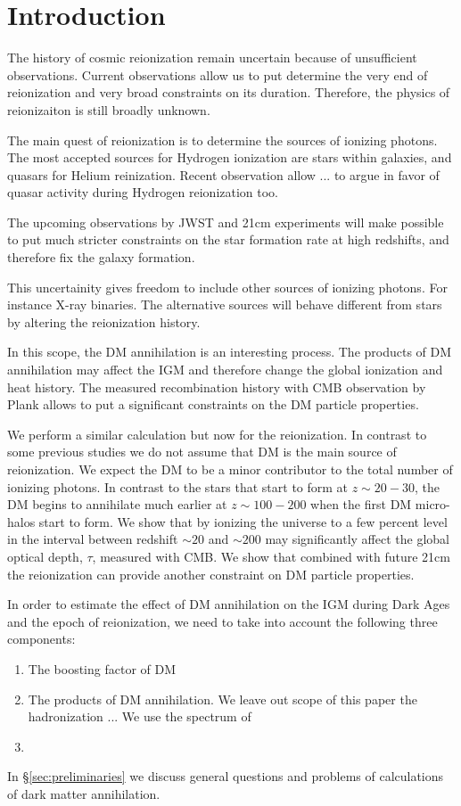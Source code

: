 \section{Introduction}

The history of cosmic reionization remain uncertain because of unsufficient observations. Current observations allow us to put determine the very end of reionization and very broad constraints on its duration. Therefore, the physics of reionizaiton is still broadly unknown.

The main quest of reionization is to determine the sources of ionizing photons. The most accepted sources for Hydrogen ionization are stars within galaxies, and quasars for Helium reinization. Recent observation allow ... to argue in favor of quasar activity during Hydrogen reionization too.

The upcoming observations by JWST and 21cm experiments will make possible to put much stricter constraints on the star formation rate at high redshifts, and therefore fix the galaxy formation.

This uncertainity gives freedom to include other sources of ionizing photons. For instance X-ray binaries. The alternative sources will behave different from stars by altering the reionization history. 

In this scope, the DM annihilation is an interesting process. The products of DM annihilation may affect the IGM and therefore change the global ionization and heat history. The measured recombination history with CMB observation by Plank allows \cite{2015arXiv150603811S} to put a significant constraints on the DM particle properties.

We perform a similar calculation but now for the reionization. In contrast to some previous studies \cite{2009JCAP...10..009C, 2009PhRvD..80c5007B} we do not assume that DM is the main source of reionization. We expect the DM to be a minor contributor to the total number of ionizing photons. In contrast to the stars that start to form at $z\sim 20-30$, the DM begins to annihilate much earlier at $z\sim100-200$ when the first DM micro-halos start to form. We show that by ionizing the universe to a few percent level in the interval between redshift $\sim20$ and $\sim200$ may significantly affect the global optical depth, $\tau$, measured with CMB. We show that combined with future 21cm the reionization can provide another constraint on DM particle properties.

In order to estimate the effect of DM annihilation on the IGM during Dark Ages and the epoch of reionization, we need to take into account the following three components:
\begin{enumerate}
\item The boosting factor of DM  
\item The products of DM annihilation. We leave out scope of this paper the hadronization ... We use the spectrum of 
\item
\end{enumerate}
In \S\ref{sec:preliminaries} we discuss general questions and problems of calculations of dark matter annihilation.

